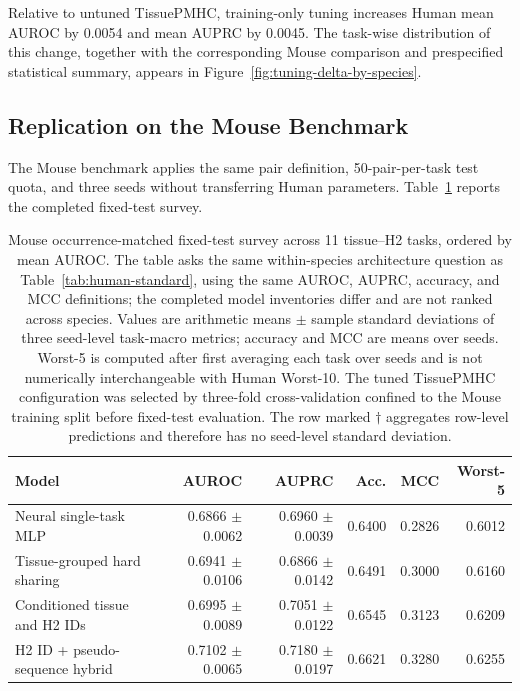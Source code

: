 Relative to untuned TissuePMHC, training-only tuning increases Human mean AUROC by 0.0054 and mean AUPRC by 0.0045. The task-wise distribution of this change, together with the corresponding Mouse comparison and prespecified statistical summary, appears in Figure~\ref{fig:tuning-delta-by-species}.

\subsection{Replication on the Mouse Benchmark}

The Mouse benchmark applies the same pair definition, 50-pair-per-task test quota, and three seeds without transferring Human parameters. Table~\ref{tab:mouse-baselines} reports the completed fixed-test survey.

\begin{table}[t]
\centering
\caption{Mouse occurrence-matched fixed-test survey across 11 tissue--H2 tasks, ordered by mean AUROC. The table asks the same within-species architecture question as Table~\ref{tab:human-standard}, using the same AUROC, AUPRC, accuracy, and MCC definitions; the completed model inventories differ and are not ranked across species. Values are arithmetic means $\pm$ sample standard deviations of three seed-level task-macro metrics; accuracy and MCC are means over seeds. Worst-5 is computed after first averaging each task over seeds and is not numerically interchangeable with Human Worst-10. The tuned TissuePMHC configuration was selected by three-fold cross-validation confined to the Mouse training split before fixed-test evaluation. The row marked $\dagger$ aggregates row-level predictions and therefore has no seed-level standard deviation.}
\label{tab:mouse-baselines}
\scriptsize
\renewcommand{\arraystretch}{1.06}
\setlength{\tabcolsep}{2.0pt}
\begin{tabularx}{\textwidth}{>{\raggedright\arraybackslash}Xrrrrr}
\toprule
Model & AUROC & AUPRC & Acc. & MCC & Worst-5 \\
\midrule
Neural single-task MLP & 0.6866 $\pm$ 0.0062 & 0.6960 $\pm$ 0.0039 & 0.6400 & 0.2826 & 0.6012 \\
Tissue-grouped hard sharing & 0.6941 $\pm$ 0.0106 & 0.6866 $\pm$ 0.0142 & 0.6491 & 0.3000 & 0.6160 \\
Conditioned tissue and H2 IDs & 0.6995 $\pm$ 0.0089 & 0.7051 $\pm$ 0.0122 & 0.6545 & 0.3123 & 0.6209 \\
H2 ID + pseudo-sequence hybrid & 0.7102 $\pm$ 0.0065 & 0.7180 $\pm$ 0.0197 & 0.6621 & 0.3280 & 0.6255 \\

\end{tabularx}
\end{table}
